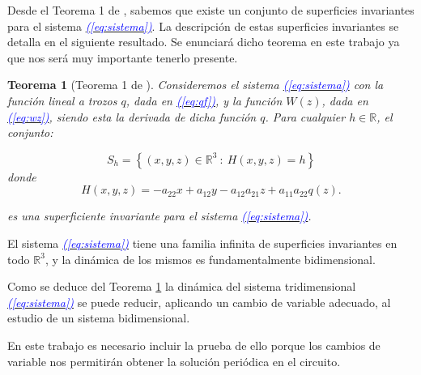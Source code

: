 \documentclass[12pt,a4paper]{report} %
\newtheorem{theorem}{Teorema}[chapter]
\newcommand{\eref}[1]{\hyperref[#1]{\textcolor{blue}{\textit{(\ref*{#1})}}}}
\begin{document}
	Desde el Teorema 1 de \cite{ponce}, sabemos que existe un conjunto de superficies invariantes para el sistema \eref{eq:sistema}. La descripción de estas superficies invariantes se detalla en el siguiente resultado. Se enunciará dicho teorema en este trabajo ya que nos será muy importante tenerlo presente.

	\begin{theorem}[Teorema 1 de \cite{ponce}]
		\label{teorema1}
		Consideremos el sistema \eref{eq:sistema} con la función lineal a trozos $q$, dada en \eref{eq:qf}, y la función $W(z)$, dada en \eref{eq:wz}, siendo esta la derivada de dicha función $q$. Para cualquier $h \in \mathbb{R}$, el conjunto:
		
		\begin{equation}
			\label{eq:sh}
			S_h=\left\{(x,y,z)\in \mathbb{R}^3\: : \: H(x,y,z)=h \right\}
		\end{equation}
		donde
		\begin{equation}
			\label{eq:hecuation}
			H(x,y,z)=-a_{22}x+a_{12}y-a_{12}a_{21}z+a_{11}a_{22}q(z).
		\end{equation}\smallskip
		
		\noindent es una superficiente invariante para el sistema \eref{eq:sistema}.
	\end{theorem}
		
		\vspace{0.5cm}\noindent El sistema \eref{eq:sistema} tiene una familia infinita de superficies invariantes en todo $\mathbb{R}^3$, y la dinámica de los mismos es fundamentalmente bidimensional.
	
	\vspace{0.5cm}Como se deduce del Teorema \ref{teorema1} la dinámica del sistema tridimensional \eref{eq:sistema} se puede reducir, aplicando un cambio de variable adecuado, al estudio de un sistema bidimensional.
	
	\vspace{0.5cm}\noindent En este trabajo es necesario incluir la prueba de ello porque los cambios de variable nos permitirán obtener la solución periódica en el circuito.
	
	\newpage
	
\end{document}
